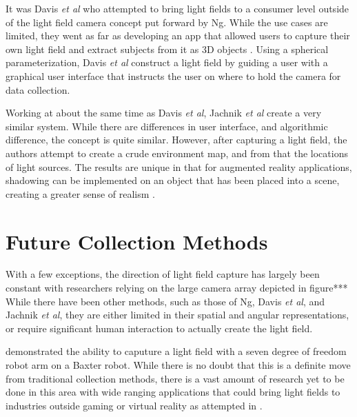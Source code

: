 \documentclass[12pt]{report}
\begin{document}
It was Davis \emph{et al} who attempted to bring light fields to a consumer level outside of the light field camera concept put forward by Ng. While the use cases are limited, they went as far as developing an app that allowed users to capture their own light field and extract subjects from it as 3D objects \cite{Davis12}. Using a spherical parameterization, Davis \emph{et al} construct a light field by guiding a user with a graphical user interface that instructs the user on where to hold the camera for data collection.

Working at about the same time as Davis \emph{et al}, Jachnik \emph{et al} create a very similar system. While there are differences in user interface, and algorithmic difference, the concept is quite similar. However, after capturing a light field, the authors attempt to create a crude environment map, and from that the locations of light sources. The results are unique in that for augmented reality applications, shadowing can be implemented on an object that has been placed into a scene, creating a greater sense of realism \cite{Jachnik13}.

\section{Future Collection Methods}
With a few exceptions, the direction of light field capture has largely been constant with researchers relying on the large camera array depicted in figure*** While there have been other methods, such as those of Ng, Davis \emph{et al}, and Jachnik \emph{et al}, they are either limited in their spatial and angular representations, or require significant human interaction to actually create the light field.

 \cite{Oberlin16} demonstrated the ability to caputure a light field with a seven degree of freedom robot arm on a Baxter robot. While there is no doubt that this is a definite move from traditional collection methods, there is a vast amount of research yet to be done in this area with wide ranging applications that could bring light fields to industries outside gaming or virtual reality as attempted in \cite{Levoy06b}.
\end{document}
